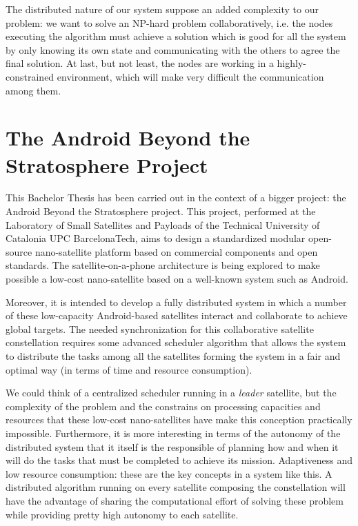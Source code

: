 The distributed nature of our system suppose an added complexity to our problem: we want to solve an NP-hard problem 
collaboratively, i.e. the nodes executing the algorithm must achieve a solution which is good for all the system by only knowing its own state and communicating with the others to agree the final solution. At last, but not least, the nodes are working in a highly-constrained environment, which will make very difficult the communication among them.


\section{The Android Beyond the Stratosphere Project}

This Bachelor Thesis has been carried out in the context of a bigger project: the Android Beyond the Stratosphere project. This project, performed at the Laboratory of Small Satellites and Payloads of the Technical University of Catalonia UPC BarcelonaTech, aims to design a standardized modular open-source nano-satellite platform based on commercial components and open standards. The satellite-on-a-phone architecture is being explored to make possible a low-cost nano-satellite based on a well-known system such as Android.

Moreover, it is intended to develop a fully distributed system in which a number of these low-capacity Android-based satellites interact and collaborate to achieve global targets. The needed synchronization for this collaborative satellite constellation requires some advanced scheduler algorithm that allows the system to distribute the tasks among all the satellites forming the system in a fair and optimal way (in terms of time and resource consumption).

We could think of a centralized scheduler running in a \emph{leader} satellite, but the complexity of the problem and the constrains on processing capacities and resources that these low-cost nano-satellites have make this conception practically impossible. Furthermore, it is more interesting in terms of the autonomy of the distributed system that it itself is the responsible of planning how and when it will do the tasks that must be completed to achieve its mission. Adaptiveness and low resource consumption: these are the key concepts in a system like this. A distributed algorithm running on every satellite composing the constellation will have the advantage of sharing the computational effort of solving these problem while providing pretty high autonomy to each satellite.



